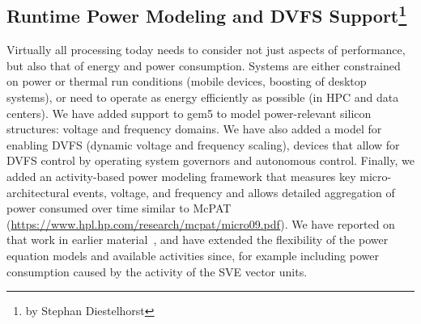 \subsection[Runtime Power Modeling and DVFS Support]{Runtime Power Modeling and DVFS Support\footnote{by Stephan Diestelhorst}}

Virtually all processing today needs to consider not just aspects of performance, but also that of energy and power consumption. Systems are either constrained on power or thermal run conditions (mobile devices, boosting of desktop systems), or need to operate as energy efficiently as possible (in HPC and data centers).
We have added support to gem5 to model power-relevant silicon structures: voltage and frequency domains.
We have also added a model for enabling DVFS (dynamic voltage and frequency scaling), devices that allow for DVFS control by operating system governors and autonomous control.
Finally, we added an activity-based power modeling framework that measures key micro-architectural events, voltage, and frequency and allows detailed aggregation of power consumed over time similar to McPAT~\cite{} (\url{https://www.hpl.hp.com/research/mcpat/micro09.pdf}).
We have reported on that work in earlier material~\cite{SpiliopoulosBHAK13}, and have extended the flexibility of the power equation models and available activities since, for example including power consumption caused by the activity of the SVE vector units.
